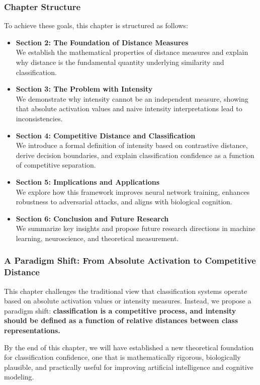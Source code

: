 
\subsubsection{Chapter Structure}

To achieve these goals, this chapter is structured as follows:

\begin{itemize}
    \item \textbf{Section 2: The Foundation of Distance Measures} \\
    We establish the mathematical properties of distance measures and explain why distance is the fundamental quantity underlying similarity and classification.
    \item \textbf{Section 3: The Problem with Intensity} \\
    We demonstrate why intensity cannot be an independent measure, showing that absolute activation values and naive intensity interpretations lead to inconsistencies.
    \item \textbf{Section 4: Competitive Distance and Classification} \\
    We introduce a formal definition of intensity based on contrastive distance, derive decision boundaries, and explain classification confidence as a function of competitive separation.
    \item \textbf{Section 5: Implications and Applications} \\
    We explore how this framework improves neural network training, enhances robustness to adversarial attacks, and aligns with biological cognition.
    \item \textbf{Section 6: Conclusion and Future Research} \\
    We summarize key insights and propose future research directions in machine learning, neuroscience, and theoretical measurement.
\end{itemize}


\subsubsection{A Paradigm Shift: From Absolute Activation to Competitive Distance}

This chapter challenges the traditional view that classification systems operate based on absolute activation values or intensity measures. Instead, we propose a paradigm shift: \textbf{classification is a competitive process, and intensity should be defined as a function of relative distances between class representations.}

By the end of this chapter, we will have established a new theoretical foundation for classification confidence, one that is mathematically rigorous, biologically plausible, and practically useful for improving artificial intelligence and cognitive modeling.

